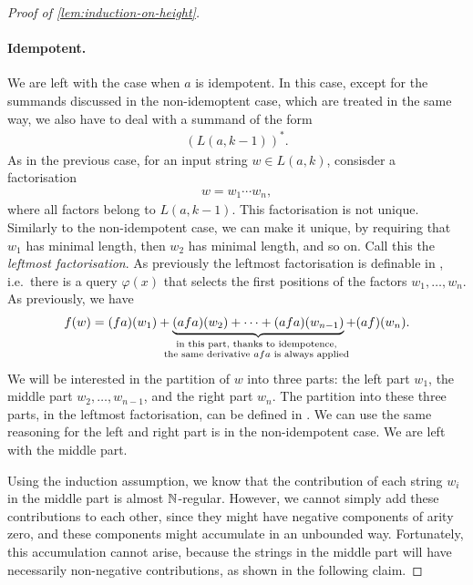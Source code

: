 \begin{proof}[Proof of \cref{lem:induction-on-height}]
\paragraph*{Idempotent.} We are left with the case when $a$ is idempotent. In this case, except for the summands discussed in the non-idemoptent case, which are treated in the same way, we also have to deal with a summand of the form 
\begin{align*}
(L(a,k-1))^*.
\end{align*}
As in the previous case, for an input string $w \in L(a,k)$, consisder a factorisation 
\begin{align*}
w = w_1 \cdots w_n,
\end{align*}
where all factors belong to $L(a,k-1)$. This factorisation is not unique. Similarly to the non-idempotent case, we can make it unique, by requiring that $w_1$ has minimal length, then $w_2$ has minimal length, and so on. Call this the \emph{leftmost factorisation}. As previously the leftmost factorisation is definable in \mso, i.e.~there is a query $\varphi(x)$ that selects the first positions of the factors $w_1,\ldots,w_n$.  As previously, we have 
\begin{align*}
f(w) = (fa)(w_1) + \myunderbrace{(afa)(w_2) +  \cdots + (afa)(w_{n-1})}{in this part, thanks to idempotence, \\ the same derivative $afa$ is always applied} + (a f)(w_n).
\end{align*}
We will be interested in the partition of $w$ into three parts: the left part $w_1$, the middle part $w_2,\ldots,w_{n-1}$, and the right part $w_n$. The partition into these three parts, in the leftmost factorisation,  can be defined in \mso.  We can use the same reasoning for the left and right part is in the non-idempotent case. We are left with the middle part. 

Using the induction assumption, we know that the contribution of each string $w_i$ in the middle part is almost ${\mathbb N}$-regular. However, we cannot simply add these contributions to each other, since they might have negative components of arity zero, and these components might accumulate in an unbounded way. Fortunately, this accumulation cannot arise, because the strings in the middle part will have necessarily non-negative contributions, as shown in the following claim. 




\end{proof}

